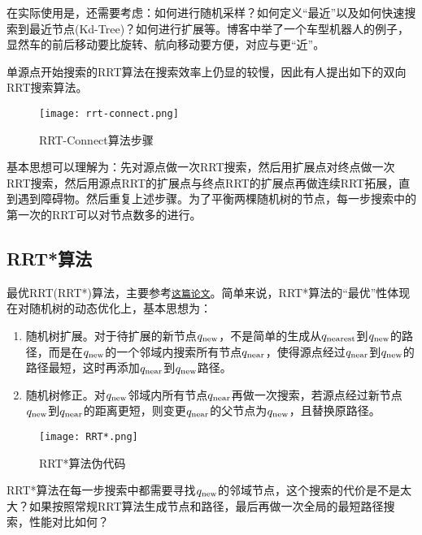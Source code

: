 在实际使用是，还需要考虑：如何进行随机采样？如何定义“最近”以及如何快速搜索到最近节点(Kd-Tree)？如何进行扩展等。博客中举了一个车型机器人的例子，显然车的前后移动要比旋转、航向移动要方便，对应与更“近”。


单源点开始搜索的RRT算法在搜索效率上仍显的较慢，因此有人提出如下的双向RRT搜索算法。
\begin{figure}[htbp]
	\figskip 
	\centering
	\texttt{[image: rrt-connect.png]}	  
	\caption{\label{fig: rrt-connect} RRT-Connect算法步骤}
\end{figure}
基本思想可以理解为：先对源点做一次RRT搜索，然后用扩展点对终点做一次RRT搜索，然后用源点RRT的扩展点与终点RRT的扩展点再做连续RRT拓展，直到遇到障碍物。然后重复上述步骤。为了平衡两棵随机树的节点，每一步搜索中的第一次的RRT可以对节点数多的进行。

\subsection{RRT*算法}
最优RRT(RRT*)算法，主要参考\href{/attachment/Sampling-based Algorithms for Optimal Motion Planning10.1.1.419.5503.pdf}{\texttt{这篇论文}}。简单来说，RRT*算法的“最优”性体现在对随机树的动态优化上，基本思想为：

\begin{enumerate}
    \item 随机树扩展。对于待扩展的新节点$q_\rm{new}$，不是简单的生成从$q_\rm{nearest}$到$q_\rm{new}$的路径，而是在$q_\rm{new}$的一个邻域内搜索所有节点$q_\rm{near}$，使得源点经过$q_\rm{near}$到$q_\rm{new}$的路径最短，这时再添加$q_\rm{near}$到$q_\rm{new}$路径。
    \item 随机树修正。对$q_\rm{new}$邻域内所有节点$q_\rm{near}$再做一次搜索，若源点经过新节点$q_\rm{new}$到$q_\rm{near}$的距离更短，则变更$q_\rm{near}$的父节点为$q_\rm{new}$，且替换原路径。
\end{enumerate}

\begin{figure}[htbp]
	\figskip 
	\centering
	\texttt{[image: RRT*.png]}	  
	\caption{\label{fig: RRT*} RRT*算法伪代码}
\end{figure}


RRT*算法在每一步搜索中都需要寻找$q_\rm{new}$的邻域节点，这个搜索的代价是不是太大？如果按照常规RRT算法生成节点和路径，最后再做一次全局的最短路径搜索，性能对比如何？

